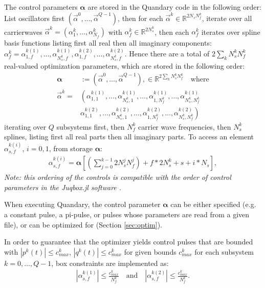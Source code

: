 \documentclass[11pt]{article}
\newcommand{\R}{\mathds{R}}
\newcommand{\bfa}{\boldsymbol{\alpha}}
\newcommand{\bs}[1]{{\boldsymbol{#1}}}
\begin{document}
The control parameters $\bs{\alpha}$ are stored in the Quandary code in the following order: List oscillators first $(\vec{\alpha}^0, \dots, \vec{\alpha}^{Q-1})$, then for each $\vec{\alpha}^k \in
\R^{2N_sN_f^k}$, iterate over all carrierwaves $\vec{\alpha}^k =
(\alpha^k_1,\dots, \alpha^k_{N_f})$ with $\alpha^k_f \in \R^{2N_s^k}$, then each
$\alpha^k_f$ iterates over spline basis functions listing first all real then all imaginary 
components: $\alpha^k_f = \alpha^{k(1)}_{1,f}, \dots, \alpha^{k(1)}_{N_s^k,f}, \alpha^{k(2)}_{1,f}, \dots, \alpha^{k(2)}_{N_s^k,f}$. Hence there are a total of $2\sum_k N_s^kN_f^k$ real-valued optimization parameters, which are stored in the following order:
  \begin{align}
    \boldsymbol{\alpha} &:= \left( \vec{\alpha}^0, \dots, \vec{\alpha}^{Q-1} \right), \in
    \mathds{R}^{2\sum_k N_s^k N_f^k} \quad \text{where}\\
    \vec{\alpha}^k = &\left( \alpha_{1,1}^{k(1)},\dots, \alpha_{N_s^k,1}^{k(1)}, \dots, \alpha_{1,N_f^k}^{k(1)}, \dots, \alpha_{N_s^k,N_f^k}^{k(1)} \right.\\
                   &  \left. \alpha_{1,1}^{k(2)},\dots, \alpha_{N_s^k,1}^{k(2)}, \dots, \alpha_{1,N_f^k}^{k(2)}, \dots, \alpha_{N_s^k,N_f^k}^{k(2)} \right)
  \end{align}
  iterating over $Q$ subsystems first, then $N_f^k$ carrier wave frequencies, then $N_s^k$ splines, listing first all real parts then all imaginary parts. To access an element $\alpha_{s,f}^{k(i)}$, $i=0,1$, from storage $\bfa$:
  \begin{align}
    \alpha_{s,f}^{k(i)} = \bfa[ \left(\sum_{j=0}^{k-1} 2N_s^jN_f^j\right) + f*2N_s^k + s + i*N_s ],
  \end{align}
  \textit{Note: this ordering of the controls is compatible with the order of control parameters in the Juqbox.jl software \cite{petersson2021optimal}.}

  When executing Quandary, the control parameter $\boldsymbol{\alpha}$ can be either specified (e.g. a constant pulse, a pi-pulse, or 
  pulses whose parameters are read from a given file), or can be optimized for (Section \ref{sec:optim}). 
  
  In order to guarantee that the optimizer yields control pulses that are
  bounded with $|p^k(t)| \leq c^k_{max}$, $|q^k(t)| \leq c^k_{max}$ for given bounds $c^k_{max}$ for each  
  subsystem $k=0,\dots, Q-1$, box constraints are implemented as:
   \begin{align}
     | \alpha_{s,f}^{k(1)}| \leq \frac{c^k_{max}}{N_f^k} \quad \text{and} \quad |
     \alpha_{s,f}^{k(2)} | \leq \frac{c^k_{max}}{N_f^k}.
   \end{align}
\end{document}
